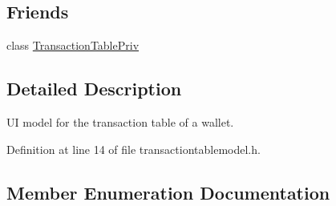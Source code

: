\subsection*{Friends}
\begin{DoxyCompactItemize}
\item 
class \hyperlink{class_transaction_table_model_a39d3ddddb3af12905ad5538a91753736}{Transaction\+Table\+Priv}
\end{DoxyCompactItemize}


\subsection{Detailed Description}
U\+I model for the transaction table of a wallet. 

Definition at line 14 of file transactiontablemodel.\+h.



\subsection{Member Enumeration Documentation}
\hypertarget{class_transaction_table_model_aca9d1efb507b6e471b31dc8c73c5bb43}{}
